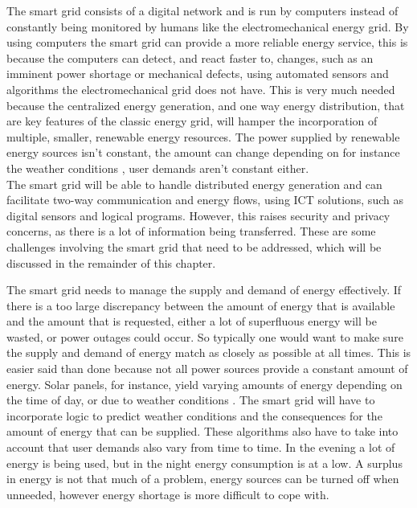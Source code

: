 The smart grid consists of a digital network and is run by computers instead of constantly being monitored by humans like the electromechanical energy grid. By using computers the smart grid can provide a more reliable energy service, this is because the computers can detect, and react faster to, changes, such as an imminent power shortage or mechanical defects, using automated sensors and algorithms the electromechanical grid does not have. This is very much needed because the centralized energy generation, and one way energy distribution, that are key features of the classic energy grid, will hamper the incorporation of multiple, smaller, renewable energy resources. The power supplied by renewable energy sources isn't constant, the amount can change depending on for instance the weather conditions \cite{RamchurnVitelingumRogersJennings2014}, user demands aren't constant either. \\
The smart grid will be able to handle distributed energy generation and can facilitate two-way communication and energy flows, using ICT solutions, such as digital sensors and logical programs. However, this raises security and privacy concerns, as there is a lot of information being transferred. These are some challenges involving the smart grid that need to be addressed, which will be discussed in the remainder of this chapter. 


The smart grid needs to manage the supply and demand of energy effectively. If there is a too large discrepancy between the amount of energy that is available and the amount that is requested, either a lot of superfluous energy will be wasted, or power outages could occur. 
So typically one would want to make sure the supply and demand of energy match as closely as possible at all times. This is easier said than done because not all power sources provide a constant amount of energy. Solar panels, for instance, yield varying amounts of energy depending on the time of day, or due to weather conditions \cite{RamchurnVitelingumRogersJennings2014}. The smart grid will have to incorporate logic to predict weather conditions and the consequences for the amount of energy that can be supplied. These algorithms also have to take into account that user demands also vary from time to time. In the evening a lot of energy is being used, but in the night energy consumption is at a low. A surplus in energy is not that much of a problem, energy sources can be turned off when unneeded, however energy shortage is more difficult to cope with.

